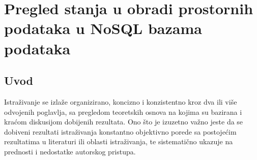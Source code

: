 \chapter{Pregled stanja u obradi prostornih podataka u NoSQL bazama podataka}
\section{Uvod}  
Istraživanje se izlaže organizirano, koncizno i konzistentno kroz dva ili više odvojenih poglavlja, sa  pregledom teoretskih osnova na kojima su bazirana i kraćom diskusijom dobijenih rezultata. Ono što je izuzetno važno jeste da se dobiveni rezultati istraživanja konstantno objektivno porede sa postojećim rezultatima u literaturi ili oblasti istraživanja, te sistematično ukazuje na prednosti i nedostatke autorskog pristupa.